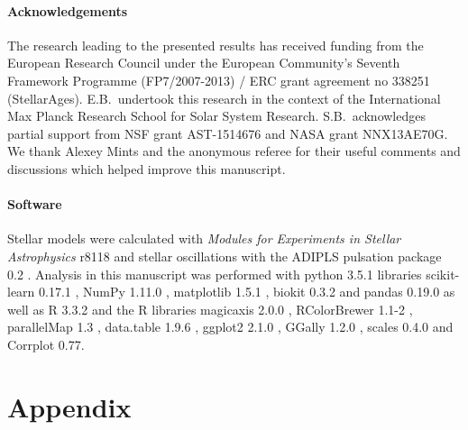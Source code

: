 \paragraph*{Acknowledgements}
\noindent The research leading to the presented results has received funding from the European Research Council under the European Community's Seventh Framework Programme (FP7/2007-2013) / ERC grant agreement no 338251 (StellarAges). E.B.\ undertook this research in the context of the International Max Planck Research School for Solar System Research. S.B.\ acknowledges partial support from NSF grant AST-1514676 and NASA grant NNX13AE70G. We thank Alexey Mints and the anonymous referee for their useful comments and discussions which helped improve this manuscript. 


\paragraph*{Software} 
\noindent Stellar models were calculated with  \emph{Modules for Experiments in Stellar Astrophysics} r8118 \citep[MESA,][]{2011apjs..192....3p} and stellar oscillations with the ADIPLS pulsation package 0.2 \citep{2008Ap&SS.316..113C}. 
Analysis in this manuscript was performed with python 3.5.1 libraries scikit-learn 0.17.1 \citep{scikit-learn}, NumPy 1.11.0 \citep{van2011numpy}, matplotlib 1.5.1  \citep{Hunter:2007}, biokit 0.3.2 \citep{biokit} and pandas 0.19.0 \citep{mckinney2010data} as well as R 3.3.2 \citep{R} and the R libraries magicaxis 2.0.0 \citep{magicaxis}, RColorBrewer 1.1-2 \citep{RColorBrewer}, parallelMap 1.3 \citep{parallelMap}, data.table 1.9.6 \citep{data.table}, ggplot2 2.1.0 \citep{ggplot2}, GGally 1.2.0 \citep{GGally}, scales 0.4.0 \citep{scales} and  Corrplot 0.77. 

%
%









\section{Appendix}


